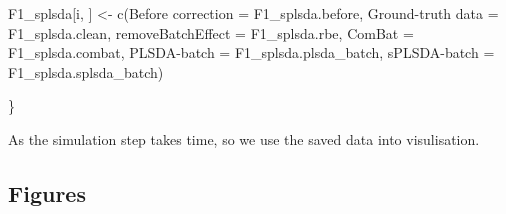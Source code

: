 \documentclass[
]{book}
\newenvironment{Shaded}{\begin{snugshade}}{\end{snugshade}}
\newcommand{\AttributeTok}[1]{\textcolor[rgb]{0.77,0.63,0.00}{#1}}
\newcommand{\FunctionTok}[1]{\textcolor[rgb]{0.00,0.00,0.00}{#1}}
\newcommand{\NormalTok}[1]{#1}
\newcommand{\OtherTok}[1]{\textcolor[rgb]{0.56,0.35,0.01}{#1}}
\newcommand{\StringTok}[1]{\textcolor[rgb]{0.31,0.60,0.02}{#1}}
\begin{document}
\begin{Shaded}
\begin{Highlighting}[]
\NormalTok{  F1\_splsda[i, ] }\OtherTok{\textless{}{-}} \FunctionTok{c}\NormalTok{(}\StringTok{\textasciigrave{}}\AttributeTok{Before correction}\StringTok{\textasciigrave{}} \OtherTok{=}\NormalTok{ F1\_splsda.before, }
                      \StringTok{\textasciigrave{}}\AttributeTok{Ground{-}truth data}\StringTok{\textasciigrave{}} \OtherTok{=}\NormalTok{ F1\_splsda.clean,}
                      \StringTok{\textasciigrave{}}\AttributeTok{removeBatchEffect}\StringTok{\textasciigrave{}} \OtherTok{=}\NormalTok{ F1\_splsda.rbe,}
                      \AttributeTok{ComBat =}\NormalTok{ F1\_splsda.combat,}
                      \StringTok{\textasciigrave{}}\AttributeTok{PLSDA{-}batch}\StringTok{\textasciigrave{}} \OtherTok{=}\NormalTok{ F1\_splsda.plsda\_batch,}
                      \StringTok{\textasciigrave{}}\AttributeTok{sPLSDA{-}batch}\StringTok{\textasciigrave{}} \OtherTok{=}\NormalTok{ F1\_splsda.splsda\_batch)}
  
\NormalTok{\}}
\end{Highlighting}
\end{Shaded}

As the simulation step takes time, so we use the saved data into visulisation.

\hypertarget{figures}{%
\subsection{Figures}\label{figures}}
\end{document}
